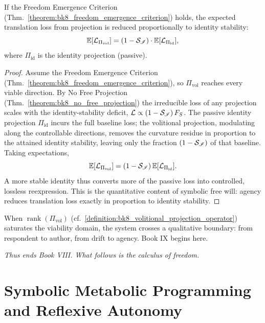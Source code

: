 \begin{corollary}
\label{corollary:bk8_symbolic_free_will}
If the Freedom Emergence Criterion (Thm.~\ref{theorem:bk8_freedom_emergence_criterion}) holds,
the expected translation loss from projection is reduced proportionally to identity stability:
\[
\mathbb{E}[\mathcal{L}_{\Pi_{\text{vol}}}] = (1 - \mathcal{S}_{\mathscr{I}}) \cdot \mathbb{E}[\mathcal{L}_{\Pi_{\text{id}}}],
\]
where $\Pi_{\text{id}}$ is the identity projection (passive).
\end{corollary}
\begin{proof}
\label{proof:bk8_symbolic_free_will}
\leavevmode
Assume the Freedom Emergence Criterion (Thm.~\ref{theorem:bk8_freedom_emergence_criterion}), so $\Pi_{\text{vol}}$ reaches every viable direction. By No Free Projection (Thm.~\ref{theorem:bk8_no_free_projection}) the irreducible loss of any projection scales with the identity-stability deficit, $\mathcal{L}\propto(1-\mathcal{S}_{\mathscr{I}})\,F_S$. The passive identity projection $\Pi_{\text{id}}$ incurs the full baseline loss; the volitional projection, modulating along the controllable directions, removes the curvature residue in proportion to the attained identity stability, leaving only the fraction $(1-\mathcal{S}_{\mathscr{I}})$ of that baseline. Taking expectations,
\[
\mathbb{E}[\mathcal{L}_{\Pi_{\text{vol}}}]=(1-\mathcal{S}_{\mathscr{I}})\,\mathbb{E}[\mathcal{L}_{\Pi_{\text{id}}}].
\]
A more stable identity thus converts more of the passive loss into controlled, lossless reexpression. This is the quantitative content of symbolic free will: agency reduces translation loss exactly in proportion to identity stability.
\end{proof}
\begin{scholium}
\label{scholium:bk8_threshold_crossing}
When $\operatorname{rank}(\Pi_{\text{vol}})$ (cf.~\ref{definition:bk8_volitional_projection_operator}) saturates the viability domain, the system crosses a qualitative boundary: from respondent to author, from drift to agency. Book IX begins here.
\end{scholium}
\vspace{1em}
\begin{center}
    \emph{Thus ends Book VIII. What follows is the calculus of freedom.}
\end{center}
\section[Symbolic Metabolic Programming]{Symbolic Metabolic Programming and Reflexive Autonomy}
\label{sec:bk8_symbolic_metabolic_programming}

